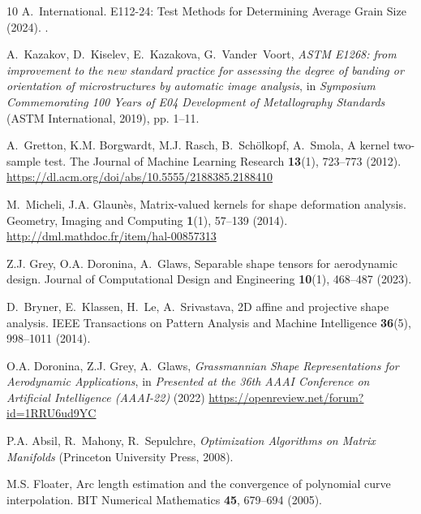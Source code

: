 \documentclass[pdflatex,iicol]{sn-jnl}%
\theoremstyle{thmstyleone}%
\theoremstyle{thmstyletwo}%
\theoremstyle{thmstylethree}%
\begin{document}
\begin{thebibliography}{10}
A.~International.
 {E112}-24: {Test} {Methods} for {Determining} {Average} {Grain} {Size} (2024).
\newblock {}.

A.~Kazakov, D.~Kiselev, E.~Kazakova, G.~Vander~Voort, \emph{{ASTM E1268}: from improvement to the new standard practice for assessing the degree of banding or orientation of microstructures by automatic image analysis}, in \emph{Symposium Commemorating 100 Years of E04 Development of Metallography Standards} (ASTM International, 2019), pp. 1--11.
\newblock {}

A.~Gretton, K.M. Borgwardt, M.J. Rasch, B.~Sch{\"o}lkopf, A.~Smola, A kernel two-sample test.
\newblock The Journal of Machine Learning Research \textbf{13}(1), 723--773 (2012).
\newblock \urlprefix\url{https://dl.acm.org/doi/abs/10.5555/2188385.2188410}

M.~Micheli, J.A. Glaun{\`e}s, Matrix-valued kernels for shape deformation analysis.
\newblock Geometry, Imaging and Computing \textbf{1}(1), 57--139 (2014).
\newblock \urlprefix\url{http://dml.mathdoc.fr/item/hal-00857313}

Z.J. Grey, O.A. Doronina, A.~Glaws, {Separable shape tensors for aerodynamic design}.
\newblock Journal of Computational Design and Engineering \textbf{10}(1), 468--487 (2023).
\newblock {}

D.~Bryner, E.~Klassen, H.~Le, A.~Srivastava, 2{D} affine and projective shape analysis.
\newblock IEEE Transactions on Pattern Analysis and Machine Intelligence \textbf{36}(5), 998--1011 (2014).
\newblock {}

O.A. Doronina, Z.J. Grey, A.~Glaws, \emph{Grassmannian Shape Representations for Aerodynamic Applications}, in \emph{Presented at the 36th AAAI Conference on Artificial Intelligence (AAAI-22)} (2022)
\newblock \urlprefix\url{https://openreview.net/forum?id=1RRU6ud9YC}

P.A. Absil, R.~Mahony, R.~Sepulchre, \emph{Optimization Algorithms on Matrix Manifolds} (Princeton University Press, 2008).
\newblock {}

M.S. Floater, Arc length estimation and the convergence of polynomial curve interpolation.
\newblock BIT Numerical Mathematics \textbf{45}, 679--694 (2005).
\newblock {}


\end{thebibliography}
\end{document}
